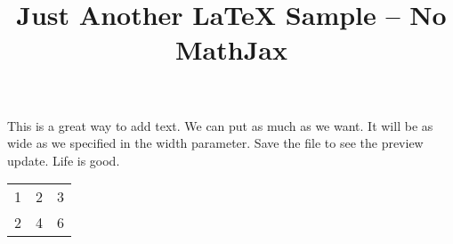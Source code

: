 \documentclass{article}
\title{Just Another LaTeX Sample -- No MathJax}
\begin{document}
\date{\vspace{-8ex}}
\maketitle
\noindent\begin{minipage}{40em}
This is a great way to add text. We can put as much as we want.  It will be as wide as we specified in the width parameter. Save the file to see the preview update.  Life is good.
\end{minipage}
\begin{table}[htb]
\begin{tabular}{lll}
1 & 2 & 3  \\
2 & 4 & 6 \\
\end{tabular}
\end{table}
\end{document}
